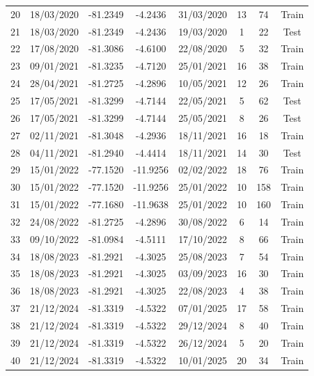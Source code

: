 \documentclass[12pt]{article}
\begin{document}
\begin{table}[p]
\begin{tabular}{|c|c|c|c|c|c|c|c|}
20 & 18/03/2020 & -81.2349 & -4.2436 & 31/03/2020 & 13 & 74 & Train \\
21 & 18/03/2020 & -81.2349 & -4.2436 & 19/03/2020 & 1 & 22 & Test \\
22 & 17/08/2020 & -81.3086 & -4.6100 & 22/08/2020 & 5 & 32 & Train \\
23 & 09/01/2021 & -81.3235 & -4.7120 & 25/01/2021 & 16 & 38 & Train \\
24 & 28/04/2021 & -81.2725 & -4.2896 & 10/05/2021 & 12 & 26 & Train \\
25 & 17/05/2021 & -81.3299 & -4.7144 & 22/05/2021 & 5 & 62 & Test \\
26 & 17/05/2021 & -81.3299 & -4.7144 & 25/05/2021 & 8 & 26 & Test \\
27 & 02/11/2021 & -81.3048 & -4.2936 & 18/11/2021 & 16 & 18 & Train \\
28 & 04/11/2021 & -81.2940 & -4.4414 & 18/11/2021 & 14 & 30 & Test \\
29 & 15/01/2022 & -77.1520 & -11.9256 & 02/02/2022 & 18 & 76 & Train \\
30 & 15/01/2022 & -77.1520 & -11.9256 & 25/01/2022 & 10 & 158 & Train \\
31 & 15/01/2022 & -77.1680 & -11.9638 & 25/01/2022 & 10 & 160 & Train \\
32 & 24/08/2022 & -81.2725 & -4.2896 & 30/08/2022 & 6 & 14 & Train \\
33 & 09/10/2022 & -81.0984 & -4.5111 & 17/10/2022 & 8 & 66 & Train \\
34 & 18/08/2023 & -81.2921 & -4.3025 & 25/08/2023 & 7 & 54 & Train \\
35 & 18/08/2023 & -81.2921 & -4.3025 & 03/09/2023 & 16 & 30 & Train \\
36 & 18/08/2023 & -81.2921 & -4.3025 & 22/08/2023 & 4 & 38 & Train \\
37 & 21/12/2024 & -81.3319 & -4.5322 & 07/01/2025 & 17 & 58 & Train \\
38 & 21/12/2024 & -81.3319 & -4.5322 & 29/12/2024 & 8 & 40 & Train \\
39 & 21/12/2024 & -81.3319 & -4.5322 & 26/12/2024 & 5 & 20 & Train \\
40 & 21/12/2024 & -81.3319 & -4.5322 & 10/01/2025 & 20 & 34 & Train \\
\hline
\end{tabular}
\end{table}
\end{document}
